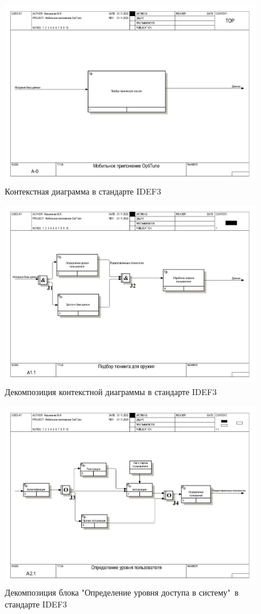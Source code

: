 \documentclass[14pt]{extreport}
\begin{document}
\begin{landscape}
\begin{figure}[H]
\centerline{\includegraphics[width=0.9\linewidth]{idef30}}
\caption{Контекстная диаграмма в стандарте IDEF3}
\label{fig18}
\end{figure}

\begin{figure}[H]
\centerline{\includegraphics[width=0.9\linewidth]{idef31}}
\caption{Декомпозиция контекстной диаграммы в стандарте IDEF3}
\label{fig19}
\end{figure}

\begin{figure}[H]
\centerline{\includegraphics[width=0.9\linewidth]{idef312}}
\caption{Декомпозиция блока "Определение уровня доступа в систему"\ в стандарте IDEF3}
\label{fig20}
\end{figure}


\end{landscape}
\end{document}
